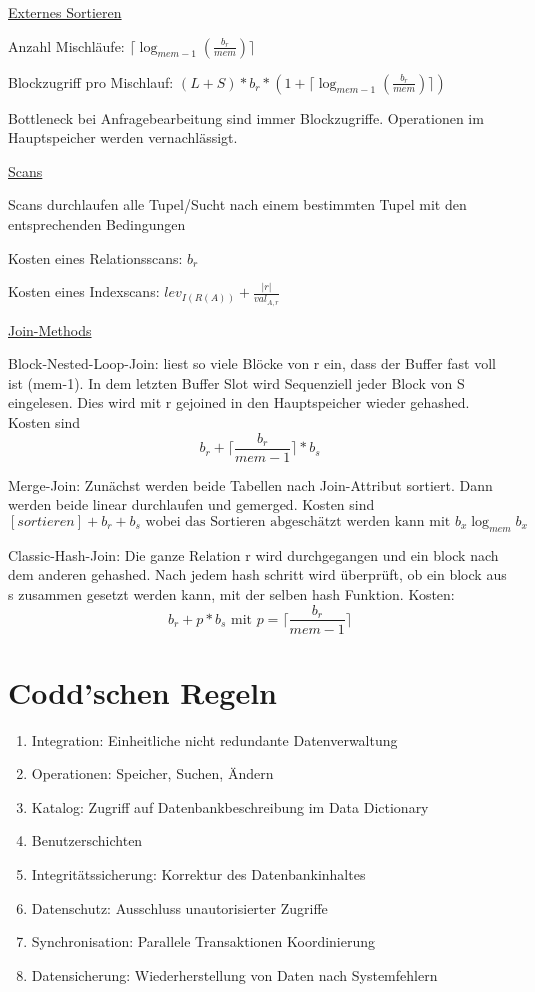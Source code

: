 \documentclass[12pt,a4paper]{article} %
\begin{document}
\underline{Externes Sortieren}

Anzahl Mischläufe: $\lceil \log_{mem - 1}(\frac{b_r}{mem}) \rceil$

Blockzugriff pro Mischlauf: $(L + S) * b_r * (1 + \lceil \log_{mem - 1}(\frac{b_r}{mem}) \rceil)$

Bottleneck bei Anfragebearbeitung sind immer Blockzugriffe. Operationen im Hauptspeicher werden vernachlässigt.

\underline{Scans}

Scans durchlaufen alle Tupel/Sucht nach einem bestimmten Tupel mit den entsprechenden Bedingungen

Kosten eines Relationsscans: $b_r$

Kosten eines Indexscans: $lev_{I(R(A))} + \frac{|r|}{val_{A, r}}$

\underline{Join-Methods}

Block-Nested-Loop-Join: liest so viele Blöcke von r ein, dass der
Buffer fast voll ist (mem-1). In dem letzten Buffer Slot wird Sequenziell jeder Block von S eingelesen. Dies wird mit r gejoined in den Hauptspeicher wieder gehashed. Kosten sind \[b_r + \lceil\frac{b_r}{mem-1}\rceil * b_s\]

Merge-Join: Zunächst werden beide Tabellen nach Join-Attribut sortiert. Dann werden beide linear durchlaufen und gemerged. Kosten sind \[[sortieren] + b_r + b_s \text{ wobei das Sortieren abgeschätzt werden kann mit } b_x \log_{mem}b_x\]

Classic-Hash-Join: Die ganze Relation r wird durchgegangen und ein block nach dem anderen gehashed. Nach jedem hash schritt wird überprüft, ob ein block aus s zusammen gesetzt werden kann, mit der selben hash Funktion. Kosten: \[b_r + p * b_s \text{ mit } p = \lceil\frac{b_r}{mem-1}\rceil\]

\section{Codd'schen Regeln}
\begin{enumerate}
	\item Integration: Einheitliche nicht redundante Datenverwaltung
	\item Operationen: Speicher, Suchen, Ändern
	\item Katalog: Zugriff auf Datenbankbeschreibung im Data Dictionary
	\item Benutzerschichten
	\item Integritätssicherung: Korrektur des Datenbankinhaltes
	\item Datenschutz: Ausschluss unautorisierter Zugriffe
	\item Synchronisation: Parallele Transaktionen Koordinierung 
	\item Datensicherung: Wiederherstellung von Daten nach Systemfehlern
\end{enumerate}
\end{document}
